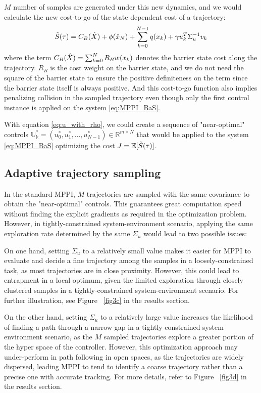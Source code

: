 \documentclass[english]{cccconf}
\begin{document}
$M$ number of samples are generated under this new dynamics, and we would calculate the new cost-to-go of the state dependent cost of a trajectory:
\begin{equation}\label{eq:cost-to-go_bas}
    \Tilde{S}(\tau) = C_B(\hat{X})+\phi(\hat{x}_N) + \sum_{k=0}^{N-1} q({x}_k)+\gamma u_{k}^T \Sigma_u^{-1} v_k
\end{equation}
where the term $C_B(\hat{X}) = \sum_{k=0}^{N} R_B \space w({x}_k)$ denotes the barrier state cost along the trajectory. $R_B$ is the cost weight on the barrier state, and we do not need the square of the barrier state to ensure the positive definiteness on the term since the barrier state itself is always positive. And this cost-to-go function also implies penalizing collision in the sampled trajectory even though only the first control instance is applied on the system \eqref{eq:MPPI_BaS}. 

With equation \eqref{eq:u_with_rho}, we could create a sequence of "near-optimal" controls $\mathbb{U_k^*} = (u_0^*, u_1^*, \ldots, u^*_{N-1}) \in \mathbb{R}^{m \times N}$ that would be applied to the
system \eqref{eq:MPPI_BaS} optimizing the cost $J= \mathbb{E}[\Tilde{S}(\tau)]$.


\subsection{Adaptive trajectory sampling}
In the standard MPPI, $M$ trajectories are sampled with the same covariance to obtain the "near-optimal" controls. This guarantees great computation speed without finding the explicit gradients as required in the optimization problem. However, in tightly-constrained system-environment scenario, applying the same exploration rate determined by the same $\Sigma_u$ would lead to two possible issues:

On one hand, setting $\Sigma_u$ to a relatively small value makes it easier for MPPI to evaluate and decide a fine trajectory among the samples in a loosely-constrained task, as most trajectories are in close proximity. However, this could lead to entrapment in a local optimum, given the limited exploration through closely clustered samples in a tightly-constrained system-environment scenario. For further illustration, see Figure ~\ref{fig3c} in the results section.

On the other hand, setting $\Sigma_u$ to a relatively large value increases the likelihood of finding a path through a narrow gap in a tightly-constrained system-environment scenario, as the $M$ sampled trajectories explore a greater portion of the hyper space of the controller. However, this optimization approach may under-perform in path following in open spaces, as the trajectories are widely dispersed, leading MPPI to tend to identify a coarse trajectory rather than a precise one with accurate tracking. For more details, refer to Figure ~\ref{fig3d} in the results section.
\end{document}
